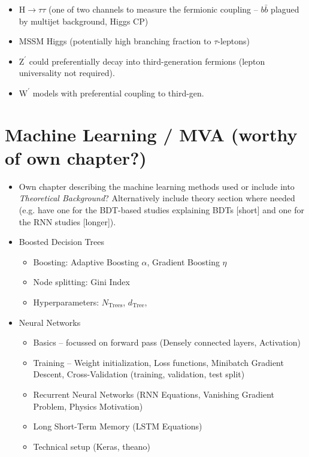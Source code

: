 \begin{itemize}
\begin{itemize}
\begin{itemize}
  \item $\mathrm{H} \rightarrow \tau \tau$ (one of two channels to measure
    the fermionic coupling -- $b \bar{b}$ plagued by multijet background,
    Higgs CP)

  \item MSSM Higgs (potentially high branching fraction to $\tau$-leptons)

  \item $\mathrm{Z}^\prime$ could preferentially decay into third-generation
    fermions (lepton universality not required).

  \item $\mathrm{W}^\prime$ models with preferential coupling to third-gen.
  \end{itemize}
\end{itemize}

\end{itemize}

\section{Machine Learning / MVA (worthy of own chapter?)}

\begin{itemize}
\item Own chapter describing the machine learning methods used or include into
  \textit{Theoretical Background}? Alternatively include theory section where
  needed (e.g. have one for the BDT-based studies explaining BDTs [short] and
  one for the RNN studies [longer]).

\item Boosted Decision Trees
  \begin{itemize}
  \item Boosting: Adaptive Boosting $\alpha$, Gradient Boosting $\eta$
  \item Node splitting: Gini Index
  \item Hyperparameters: $N_\mathrm{Trees}$, $d_\mathrm{Tree}$,
  \end{itemize}

\item Neural Networks
  \begin{itemize}
  \item Basics -- focussed on forward pass (Densely connected layers, Activation)
  \item Training -- Weight initialization, Loss functions, Minibatch Gradient
    Descent, Cross-Validation (training, validation, test split)
  \item Recurrent Neural Networks (RNN Equations, Vanishing Gradient Problem,
    Physics Motivation)
  \item Long Short-Term Memory \cite{lstm} (LSTM Equations)
  \item Technical setup (Keras, theano)
  \end{itemize}
\end{itemize}

